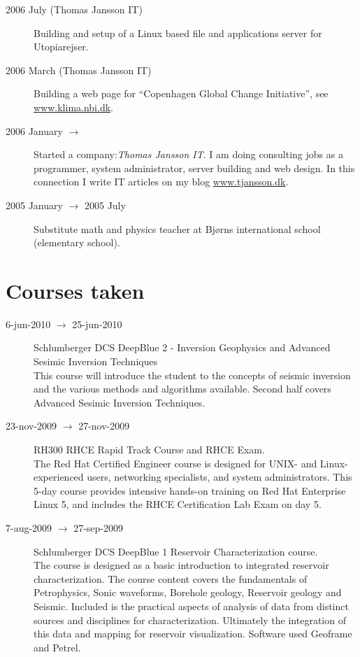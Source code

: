 \documentclass[margin,line,a4paper]{resume05}
\begin{document}
\begin{resume}
\begin{description}
    \item[2006 July (Thomas Jansson IT)] Building and setup of a Linux based file and applications
    server for Utopiarejser.  
    \item[2006 March (Thomas Jansson IT)] Building a web page for ``Copenhagen Global Change
    Initiative'', see \url{www.klima.nbi.dk}. 
    \item[2006 January $\rightarrow$ ] Started a company:\textit{Thomas Jansson IT}.
    I am doing consulting jobs as a programmer, system administrator, server
    building and web design. In this connection I write IT articles on my blog 
    \url{www.tjansson.dk}.
    \item[2005 January $\rightarrow$ 2005 July ] Substitute math and physics teacher at Bjørns
    international school (elementary school). 
\end{description}


\section{\mysidestyle Courses taken}\vspace{1mm}
\begin{description}
    \item[ 6-jun-2010 $\rightarrow$ 25-jun-2010] Schlumberger DCS DeepBlue 2 -
    Inversion Geophysics and Advanced Sesimic Inversion Techniques \\
    This course will introduce the student to the concepts of seismic inversion and
    the various methods and algorithms available. Second half covers Advanced
    Sesimic Inversion Techniques. 

    \item[ 23-nov-2009 $\rightarrow$ 27-nov-2009] RH300 RHCE Rapid Track Course and RHCE Exam.\\
    The Red Hat Certified Engineer course is designed for UNIX- and
    Linux-experienced users, networking specialists, and system administrators.
    This 5-day course provides intensive hands-on training on Red Hat
    Enterprise Linux 5, and includes the RHCE Certification Lab Exam on day 5.

    \item[7-aug-2009 $\rightarrow$ 27-sep-2009 ] Schlumberger DCS DeepBlue 1 Reservoir
    Characterization course. \\
    The course is designed as a basic introduction to integrated
    reservoir characterization. The course content covers the fundamentals of
    Petrophysics, Sonic waveforms, Borehole geology, Reservoir geology and
    Seismic. Included is the practical aspects of analysis of data from
    distinct sources and disciplines for characterization. Ultimately the
    integration of this data and mapping for reservoir visualization. Software
    used Geoframe and Petrel. 
    

\end{description}
\end{resume}
\end{document}
